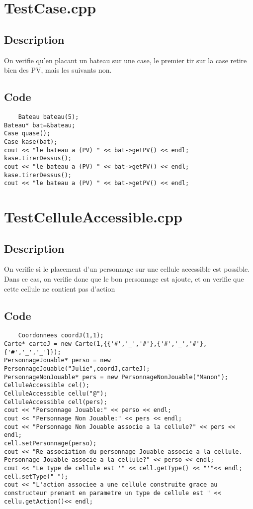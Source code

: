     \section{TestCase.cpp}
        \subsection{Description}
            On verifie qu'en placant un bateau sur une case, le premier tir sur la case retire bien des PV, mais les suivants non.
        \subsection{Code}
\begin{lstlisting}
	Bateau bateau(5);
Bateau* bat=&bateau;
Case quase();
Case kase(bat);
cout << "le bateau a (PV) " << bat->getPV() << endl;
kase.tirerDessus();
cout << "le bateau a (PV) " << bat->getPV() << endl;
kase.tirerDessus();
cout << "le bateau a (PV) " << bat->getPV() << endl;
	\end{lstlisting}
    \section{TestCelluleAccessible.cpp}
        \subsection{Description}
            On verifie si le placement d'un personnage sur une cellule accessible est possible.\\
            Dans ce cas, on verifie donc que le bon personnage est ajoute, et on verifie que cette cellule ne contient pas d'action
        \subsection{Code}
\begin{lstlisting}
	Coordonnees coordJ(1,1);
Carte* carteJ = new Carte(1,{{'#','_','#'},{'#','_','#'},{'#','_','_'}});
PersonnageJouable* perso = new PersonnageJouable("Julie",coordJ,carteJ);
PersonnageNonJouable* pers = new PersonnageNonJouable("Manon");
CelluleAccessible cel();
CelluleAccessible cellu("@");
CelluleAccessible cell(pers);
cout << "Personnage Jouable:" << perso << endl;
cout << "Personnage Non Jouable:" << pers << endl;
cout << "Personnage Non Jouable associe a la cellule?" << pers << endl;
cell.setPersonnage(perso);
cout << "Re association du personnage Jouable associe a la cellule. Personnage Jouable associe a la cellule?" << perso << endl;
cout << "Le type de cellule est '" << cell.getType() << "'"<< endl;
cell.setType(" ");
cout << "L'action associee a une cellule construite grace au constructeur prenant en parametre un type de cellule est " << cellu.getAction()<< endl;
	\end{lstlisting}
